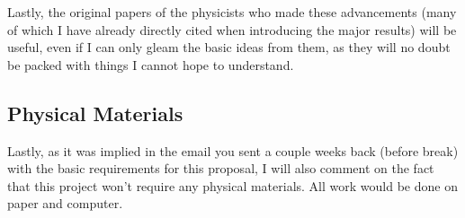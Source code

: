 Lastly, the original papers of the physicists who made these advancements (many of which I have already directly cited when introducing the major results) will be useful, even if I can only gleam the basic ideas from them, as they will no doubt be packed with things I cannot hope to understand.

\subsection{Physical Materials}

Lastly, as it was implied in the email you sent a couple weeks back (before break) with the basic requirements for this proposal, I will also comment on the fact that this project won't require any physical materials. All work would be done on paper and computer.




